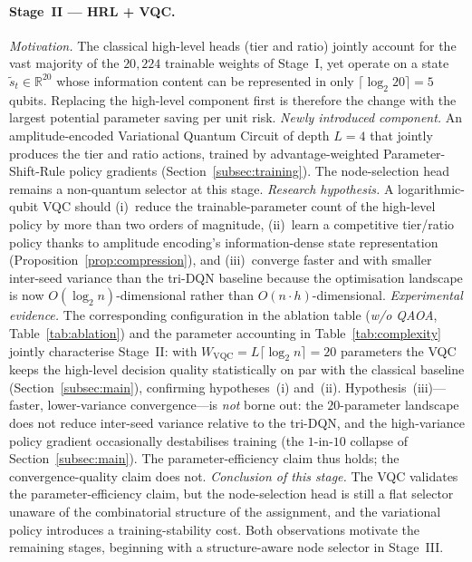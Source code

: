 \documentclass[11pt,a4paper]{article}
\theoremstyle{definition}
\begin{document}
\paragraph{Stage~II --- HRL + VQC.}
\emph{Motivation.} The classical high-level heads (tier and ratio) jointly account for the vast majority of the $20{,}224$ trainable weights of Stage~I, yet operate on a state $\tilde s_t\!\in\!\mathbb{R}^{20}$ whose information content can be represented in only $\lceil\log_2 20\rceil\!=\!5$ qubits. Replacing the high-level component first is therefore the change with the largest potential parameter saving per unit risk.
\emph{Newly introduced component.} An amplitude-encoded Variational Quantum Circuit of depth $L\!=\!4$ that jointly produces the tier and ratio actions, trained by advantage-weighted Parameter-Shift-Rule policy gradients (Section~\ref{subsec:training}). The node-selection head remains a non-quantum selector at this stage.
\emph{Research hypothesis.} A logarithmic-qubit VQC should (i)~reduce the trainable-parameter count of the high-level policy by more than two orders of magnitude, (ii)~learn a competitive tier/ratio policy thanks to amplitude encoding's information-dense state representation (Proposition~\ref{prop:compression}), and (iii)~converge faster and with smaller inter-seed variance than the tri-DQN baseline because the optimisation landscape is now $O(\log_2 n)$-dimensional rather than $O(n\cdot h)$-dimensional.
\emph{Experimental evidence.} The corresponding configuration in the ablation table (\emph{w/o QAOA}, Table~\ref{tab:ablation}) and the parameter accounting in Table~\ref{tab:complexity} jointly characterise Stage~II: with $W_{\mathrm{VQC}}\!=\!L\lceil\log_2 n\rceil\!=\!20$ parameters the VQC keeps the high-level decision quality statistically on par with the classical baseline (Section~\ref{subsec:main}), confirming hypotheses~(i) and~(ii). Hypothesis~(iii)---faster, lower-variance convergence---is \emph{not} borne out: the $20$-parameter landscape does not reduce inter-seed variance relative to the tri-DQN, and the high-variance policy gradient occasionally destabilises training (the $1$-in-$10$ collapse of Section~\ref{subsec:main}). The parameter-efficiency claim thus holds; the convergence-quality claim does not.
\emph{Conclusion of this stage.} The VQC validates the parameter-efficiency claim, but the node-selection head is still a flat selector unaware of the combinatorial structure of the assignment, and the variational policy introduces a training-stability cost. Both observations motivate the remaining stages, beginning with a structure-aware node selector in Stage~III.
\end{document}
